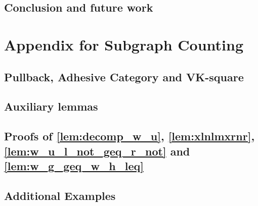 \documentclass{report}
\begin{document}
\section{Conclusion and future work}
\label{sec:conclusion} 


% 
% 

\chapter{Appendix for Subgraph Counting}
\section*{Pullback, Adhesive Category and VK-square}

\newpage
\section*{Auxiliary lemmas}

\newpage
\section{Proofs of \autoref{lem:decomp_w_u}, \autoref{lem:xlnlmxrnr}, \autoref{lem:w_u_l_not_geq_r_not} and \autoref{lem:w_g_geq_w_h_leq}}
\label{sec:appendix:a}

\section{Additional Examples}

 

\printbibliography
\end{document}
